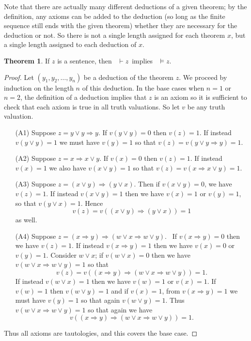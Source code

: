 \documentclass[11pt,titlepage]{article}
\newcommand{\imp}{\Rightarrow}
\theoremstyle{definition}
\newtheorem{theorem}[definition]{Theorem}
\begin{document}
Note that there are actually many different deductions of a given theorem; by the definition, any axioms can be added to the deduction (so long as the finite sequence still ends with the given theorem) whether they are necessary for the deduction or not. So there is not a single length assigned for each theorem $x$, but a single length assigned to each deduction of $x$.

\begin{theorem}\label{weak} If $z$ is a sentence, then \ $\vdash z$\  implies \ $\vDash z$.\end{theorem}
\begin{proof} Let $(y_1,y_2,\ldots, y_n)$ be a deduction of the theorem $z$. We proceed by induction on the length $n$ of this deduction. In the base cases when $n=1$ or $n=2$, the definition of a deduction implies that $z$ is an axiom so it is sufficient to check that each axiom is true in all truth valuations. So let $v$ be any truth valuation.
\begin{enumerate}
\item[(A1)]{Suppose $z= y\lor y \imp y$. If $v(y\lor y)=0$ then $v(z)=1$. If instead $v(y\lor y)=1$ we must have $v(y)=1$ so that $v(z) = v(y\lor y \imp y)  =1.$ }
\item[(A2)]{Suppose $z=x \imp x\lor y$. If $v(x)=0$ then $v(z)=1.$ If instead $v(x)=1$ we also have $v(x\lor y)=1$ so that $v(z)=v(x\imp x\lor y) = 1.$  }
\item[(A3)]{Suppose $z=(x\lor y) \imp (y\lor x).$ Then if $v(x\lor y)=0$, we have $v(z)=1$. If instead $v(x\lor y)=1$ then we have $v(x)=1$ or $v(y)=1$, so that $v(y\lor x)=1$. Hence $$v(z)=v((x\lor y)\imp (y\lor x))=1$$ as well.} %
\item[(A4)]{Suppose $z=(x\imp y) \imp (w \lor x \imp w\lor y).$ \ If $v(x\imp y)=0$ then we have $v(z)=1$. If instead $v(x\imp y)=1$ then we have $v(x)=0$ or $v(y)=1$. Consider $w\lor x$; if $v(w\lor x)=0$ then we have $v(w\lor x \imp w\lor y)=1$ so that $$v(z) = v((x\imp y) \imp (w \lor x \imp w\lor y))=1.$$ If instead $v(w\lor x)=1$ then we have $v(w)=1$ or $v(x)=1$. If $v(w)=1$ then $v(w\lor y) =1$ and if $v(x)=1$, from $v(x\imp y)=1$ we must have $v(y)=1$ so that again $v(w\lor y)=1$. Thus $v(w\lor x \imp w\lor y)=1$ so that again we have $$v((x\imp y)\imp(w\lor x \imp w\lor y))=1.$$}
\end{enumerate} Thus all axioms are tautologies, and this covers the base case.


\end{proof}
\end{document}
